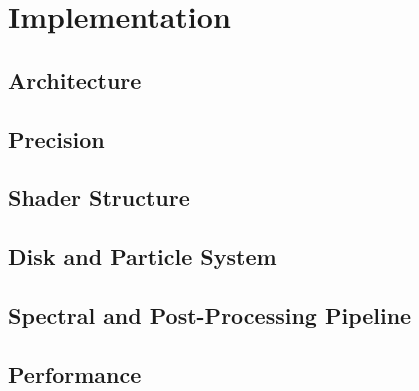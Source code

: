 \chapter{Implementation}\label{ch:implementation}

\section{Architecture}\label{sec:architecture}

\section{Precision}\label{sec:precision}

\section{Shader Structure}\label{sec:shader-structure}

\section{Disk and Particle System}\label{sec:disk-and-particle-system}

\section{Spectral and Post-Processing Pipeline}\label{sec:spectral-and-post-processing-pipeline}

\section{Performance}\label{sec:performance}
